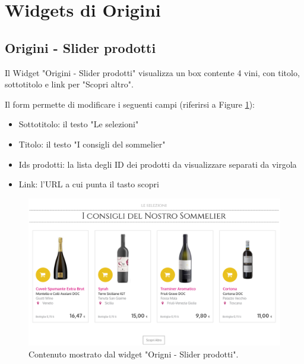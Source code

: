 


\newpage
\section{Widgets di Origini}


\subsection{Origini - Slider prodotti}
Il Widget "Origini - Slider prodotti" visualizza un box contente
4 vini, con titolo, sottotitolo e link per "Scopri altro".

Il form permette di modificare i seguenti campi (riferirsi a Figure \ref{fig:oprod}):
\begin{itemize}
\item Sottotitolo: il testo "Le selezioni"
\item Titolo: il testo "I consigli del sommelier"
\item Ids prodotti: la lista degli ID dei prodotti da visualizzare separati da virgola
\item Link: l'URL a cui punta il tasto scopri
\end{itemize}

\begin{figure}
  \includegraphics[width=\textwidth]{figure/oprod.png}
  \caption{Contenuto mostrato dal widget "Origni - Slider prodotti".}
  \label{fig:oprod}
\end{figure}


